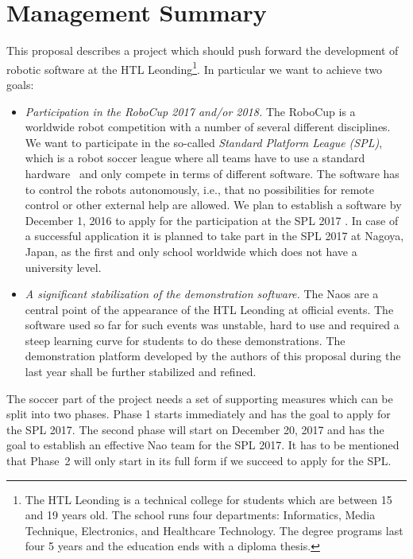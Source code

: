 \documentclass[12pt]{article}
\theoremstyle{definition}
\begin{document}
\setcounter{tocdepth}{2}
\tableofcontents
\pagebreak

\section{Management Summary}\label{sec:managementsummary}
This proposal describes a project which should push forward the development of robotic software at the HTL Leonding\footnote{The HTL Leonding is a technical college for students which are between 15 and 19 years old. The school runs four departments: Informatics, Media Technique, Electronics, and Healthcare Technology. The degree programs last four 5 years and the education ends with a diploma thesis.}. In particular we want to achieve two goals:

\begin{itemize}
	\item {\em Participation in the RoboCup 2017 and/or 2018.} The RoboCup is a worldwide robot competition with a number of several different disciplines. We want to participate in the so-called {\em Standard Platform League (SPL)}, which is a robot soccer league where all teams have to use a standard hardware~\cite{softbank_robotics_who_2016} and only compete in terms of different software. The software has to control the robots autonomously, i.e., that no possibilities for remote control or other external help are allowed. We plan to establish a software by December 1, 2016 to apply for the participation at the SPL 2017 . In case of a successful application it is planned to take part in the SPL 2017 at Nagoya, Japan, as the first and only school worldwide which does not have a university level.
	
	\item {\em A significant stabilization of the demonstration software.} The Naos are a central point of the appearance of the HTL Leonding at official events. The software used so far for such events was unstable, hard to use and required a steep learning curve for students to do these demonstrations. The demonstration platform developed by the authors of this proposal during the last year shall be further stabilized and refined.
\end{itemize}

The soccer part of the project needs a set of supporting measures which can be split into two phases. Phase 1 starts immediately and has the goal to apply for the SPL 2017. The second phase will start on December 20, 2017 and has the goal to establish an effective Nao team for the SPL 2017. It has to be mentioned that Phase~2 will only start in its full form if we succeed to apply for the SPL.
\end{document}
